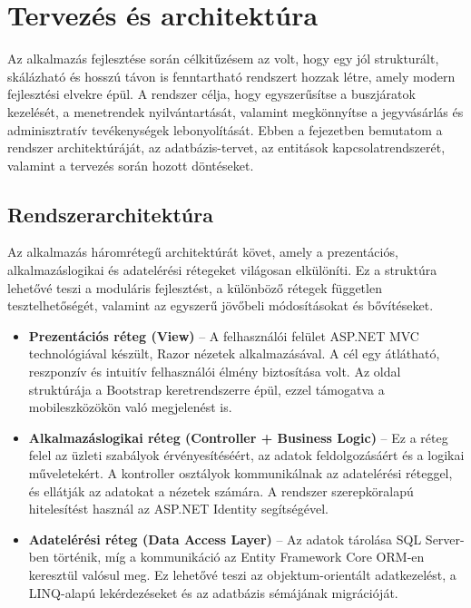 \section{Tervezés és architektúra}

\indent Az alkalmazás fejlesztése során célkitűzésem az volt, hogy egy jól strukturált, skálázható és hosszú távon is fenntartható rendszert hozzak létre, amely modern fejlesztési elvekre épül. A rendszer célja, hogy egyszerűsítse a buszjáratok kezelését, a menetrendek nyilvántartását, valamint megkönnyítse a jegyvásárlás és adminisztratív tevékenységek lebonyolítását. Ebben a fejezetben bemutatom a rendszer architektúráját, az adatbázis-tervet, az entitások kapcsolatrendszerét, valamint a tervezés során hozott döntéseket.

\subsection{Rendszerarchitektúra}

\indent Az alkalmazás háromrétegű architektúrát követ, amely a prezentációs, alkalmazáslogikai és adatelérési rétegeket világosan elkülöníti. Ez a struktúra lehetővé teszi a moduláris fejlesztést, a különböző rétegek független tesztelhetőségét, valamint az egyszerű jövőbeli módosításokat és bővítéseket.

\begin{itemize}
    \item \textbf{Prezentációs réteg (View)} – A felhasználói felület ASP.NET MVC technológiával készült, Razor nézetek alkalmazásával. A cél egy átlátható, reszponzív és intuitív felhasználói élmény biztosítása volt. Az oldal struktúrája a Bootstrap keretrendszerre épül, ezzel támogatva a mobileszközökön való megjelenést is.
    
    \item \textbf{Alkalmazáslogikai réteg (Controller + Business Logic)} – Ez a réteg felel az üzleti szabályok érvényesítéséért, az adatok feldolgozásáért és a logikai műveletekért. A kontroller osztályok kommunikálnak az adatelérési réteggel, és ellátják az adatokat a nézetek számára. A rendszer szerepköralapú hitelesítést használ az ASP.NET Identity segítségével.

    \item \textbf{Adatelérési réteg (Data Access Layer)} – Az adatok tárolása SQL Server-ben történik, míg a kommunikáció az Entity Framework Core ORM-en keresztül valósul meg. Ez lehetővé teszi az objektum-orientált adatkezelést, a LINQ-alapú lekérdezéseket és az adatbázis sémájának migrációját.
\end{itemize}


